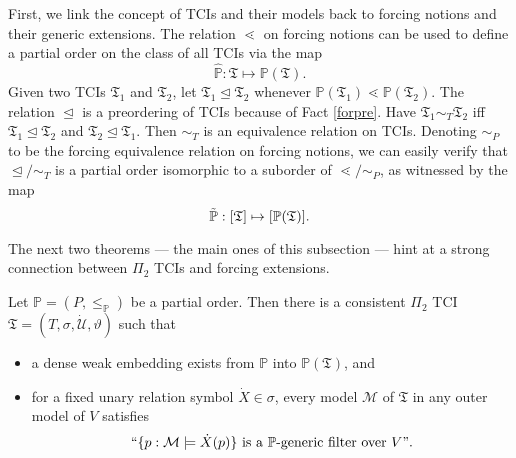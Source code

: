 \documentclass[12pt]{article}
\numberwithin{equation}{section}
\begin{document}
First, we link the concept of TCIs and their models back to forcing notions and their generic extensions. The relation $\lessdot$ on forcing notions can be used to define a partial order on the class of all TCIs via the map 
\begin{equation}\label{pmap}
    \hat{\mathbb{P}} : \mathfrak{T} \mapsto \mathbb{P}(\mathfrak{T}) \text{.}
\end{equation}
Given two TCIs $\mathfrak{T}_1$ and $\mathfrak{T}_2$, let $\mathfrak{T}_1 \trianglelefteq \mathfrak{T}_2$ whenever $\mathbb{P}(\mathfrak{T}_1) \lessdot \mathbb{P}(\mathfrak{T}_2)$. The relation $\trianglelefteq$ is a preordering of TCIs because of Fact \ref{forpre}. Have $\mathfrak{T}_1 \sim_T \mathfrak{T}_2$ iff $\mathfrak{T}_1 \trianglelefteq \mathfrak{T}_2$ and $\mathfrak{T}_2 \trianglelefteq \mathfrak{T}_1$. Then $\sim_T$ is an equivalence relation on TCIs. Denoting $\sim_P$ to be the forcing equivalence relation on forcing notions, we can easily verify that $\trianglelefteq / \sim_T$ is a partial order isomorphic to a suborder of $\lessdot / \sim_P$, as witnessed by the map 
\begin{equation}\label{peqmap}
    \Tilde{\mathbb{P}}: [\mathfrak{T}] \mapsto [\mathbb{P}(\mathfrak{T})] \text{.}
\end{equation}

The next two theorems --- the main ones of this subsection --- hint at a strong connection between $\Pi_2$ TCIs and forcing extensions.

\begin{thm}\label{revgenmodels}
Let $\mathbb{P} = (P, \leq_{\mathbb{P}})$ be a partial order. Then there is a consistent $\Pi_2$ TCI $\mathfrak{T} = (T, \sigma, \dot{\mathcal{U}}, \vartheta)$ such that
\begin{itemize}
    \item a dense weak embedding exists from $\mathbb{P}$ into $\mathbb{P}(\mathfrak{T})$, and
    \item for a fixed unary relation symbol $\dot{X} \in \sigma$, every model $\mathcal{M}$ of $\mathfrak{T}$ in any outer model of $V$ satisfies $$``\{p : \mathcal{M} \models \dot{X}(p)\} \text{ is a } \mathbb{P} \text{-generic filter over } V" \text{.}$$
\end{itemize}
\end{thm}
\end{document}
